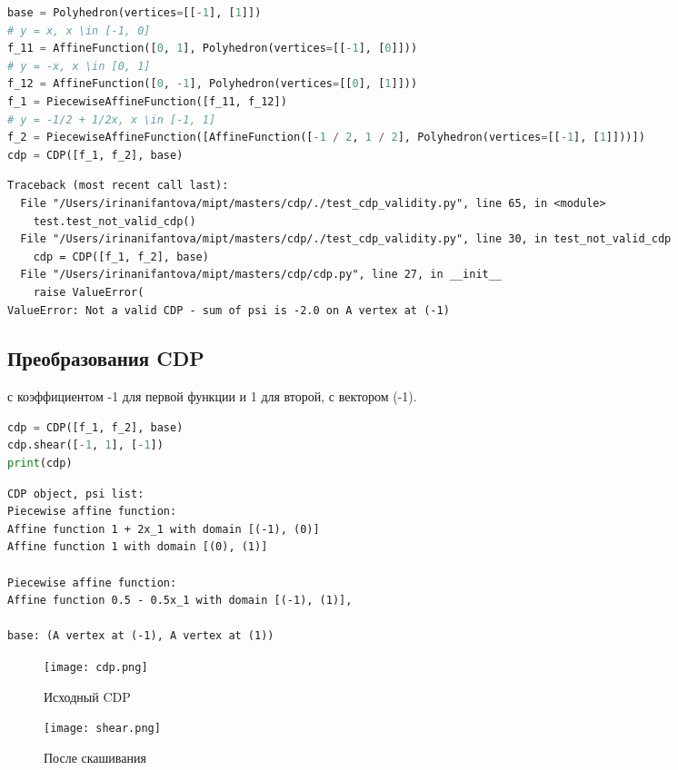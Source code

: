 \documentclass[fontsize=14pt]{scrartcl}
\theoremstyle{definition}
\begin{document}
\begin{lstlisting}[language=Python,style=python]
base = Polyhedron(vertices=[[-1], [1]])
# y = x, x \in [-1, 0]
f_11 = AffineFunction([0, 1], Polyhedron(vertices=[[-1], [0]]))
# y = -x, x \in [0, 1]
f_12 = AffineFunction([0, -1], Polyhedron(vertices=[[0], [1]]))
f_1 = PiecewiseAffineFunction([f_11, f_12])
# y = -1/2 + 1/2x, x \in [-1, 1]
f_2 = PiecewiseAffineFunction([AffineFunction([-1 / 2, 1 / 2], Polyhedron(vertices=[[-1], [1]]))])
cdp = CDP([f_1, f_2], base)	
\end{lstlisting}

\begin{lstlisting}[style=output]
Traceback (most recent call last):
  File "/Users/irinanifantova/mipt/masters/cdp/./test_cdp_validity.py", line 65, in <module>
    test.test_not_valid_cdp()
  File "/Users/irinanifantova/mipt/masters/cdp/./test_cdp_validity.py", line 30, in test_not_valid_cdp
    cdp = CDP([f_1, f_2], base)
  File "/Users/irinanifantova/mipt/masters/cdp/cdp.py", line 27, in __init__
    raise ValueError(
ValueError: Not a valid CDP - sum of psi is -2.0 on A vertex at (-1)
\end{lstlisting}


\subsection{Преобразования CDP}

 с коэффициентом -1 для первой функции и 1 для второй, с вектором (-1).

\begin{lstlisting}[language=Python,style=python]
cdp = CDP([f_1, f_2], base)
cdp.shear([-1, 1], [-1])
print(cdp)
\end{lstlisting}


\begin{lstlisting}[style=output]
CDP object, psi list:
Piecewise affine function:
Affine function 1 + 2x_1 with domain [(-1), (0)]
Affine function 1 with domain [(0), (1)]

Piecewise affine function:
Affine function 0.5 - 0.5x_1 with domain [(-1), (1)],

base: (A vertex at (-1), A vertex at (1))
\end{lstlisting}

\begin{figure}[!htb]
  \texttt{[image: cdp.png]}
  \caption{Исходный CDP}\label{fig:awesome_image1}
\endminipage\hfill
{}
  \texttt{[image: shear.png]}
  \caption{После скашивания}\label{fig:awesome_image2}
\endminipage\hfill
\end{figure}
\end{document}
